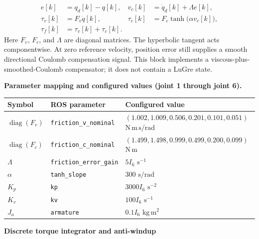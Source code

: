 \documentclass[11pt,a4paper]{report}
\newcommand{\diag}{\operatorname{diag}}
\begin{document}
\begin{landscape}
\begin{align*}
  e[k]&=q_d[k]-q[k], &
  v_c[k]&=\dot q_d[k]+\Lambda e[k],\\
  \tau_v[k]&=F_v\dot q[k], &
  \tau_c[k]&=F_c\tanh\!\bigl(\alpha v_c[k]\bigr),\\
  \tau_f[k]&=\tau_v[k]+\tau_c[k].
\end{align*}
Here $F_v$, $F_c$, and $\Lambda$ are diagonal matrices. The hyperbolic tangent
acts componentwise. At zero reference velocity, position error still supplies
a smooth directional Coulomb compensation signal. This block implements a
viscous-plus-smoothed-Coulomb compensator; it does not contain a LuGre state.

\bigskip
\textbf{Parameter mapping and configured values (joint 1 through joint 6).}
\begin{center}
\renewcommand{\arraystretch}{1.5}
\begin{tabular}{lll}
Symbol & ROS parameter & Configured value \\
\hline
$\diag(F_v)$ & \texttt{friction\_v\_nominal}
  & $(1.002,1.009,0.506,0.201,0.101,0.051)$ $\mathrm{N\,m\,s/rad}$\\
$\diag(F_c)$ & \texttt{friction\_c\_nominal}
  & $(1.499,1.498,0.999,0.499,0.200,0.099)$ $\mathrm{N\,m}$\\
$\Lambda$ & \texttt{friction\_error\_gain} & $5I_6$ $\mathrm{s^{-1}}$\\
$\alpha$ & \texttt{tanh\_slope} & $300$ $\mathrm{s/rad}$\\
$K_p$ & \texttt{kp} & $3000I_6$ $\mathrm{s^{-2}}$\\
$K_v$ & \texttt{kv} & $100I_6$ $\mathrm{s^{-1}}$\\
$J_a$ & \texttt{armature} & $0.1I_6$ $\mathrm{kg\,m^2}$
\end{tabular}
\end{center}

\clearpage
\begin{center}
  {\Large\bfseries Discrete torque integrator and anti-windup}
\end{center}


\end{landscape}
\end{document}
